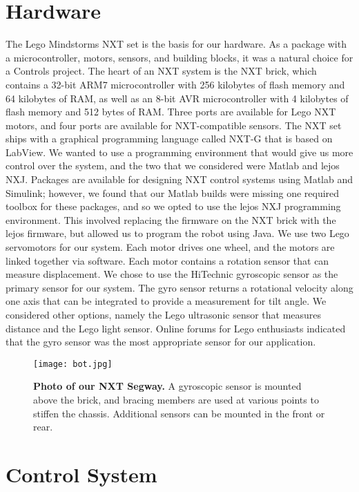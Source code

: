 \documentclass[onecolumn, draftclass]{IEEEtran} %
\begin{document}
\section{Hardware}
The Lego Mindstorms NXT set is the basis for our hardware.  As a package with a microcontroller, motors, sensors, and building blocks, it was a natural choice for a Controls project.  The heart of an NXT system is the NXT brick, which contains a 32-bit ARM7 microcontroller with 256 kilobytes of flash memory and 64 kilobytes of RAM, as well as an 8-bit AVR microcontroller with 4 kilobytes of flash memory and 512 bytes of RAM.  Three ports are available for Lego NXT motors, and four ports are available for NXT-compatible sensors.  The NXT set ships with a graphical programming language called NXT-G that is based on LabView.  We wanted to use a programming environment that would give us more control over the system, and the two that we considered were Matlab and lejos NXJ.  Packages are available for designing NXT control systems using Matlab and Simulink; however, we found that our Matlab builds were missing one required toolbox for these packages, and so we opted to use the lejos NXJ programming environment.  This involved replacing the firmware on the NXT brick with the lejos firmware, but allowed us to program the robot using Java.
We use two Lego servomotors for our system.  Each motor drives one wheel, and the motors are linked together via software.  Each motor contains a rotation sensor that can measure displacement.  We chose to use the HiTechnic gyroscopic sensor as the primary sensor for our system.  The gyro sensor returns a rotational velocity along one axis that can be integrated to provide a measurement for tilt angle.  We considered other options, namely the Lego ultrasonic sensor that measures distance and the Lego light sensor.  Online forums for Lego enthusiasts indicated that the gyro sensor was the most appropriate sensor for our application.

\begin{figure} [h]
\centering
\texttt{[image: bot.jpg]}
\caption{\textbf{Photo of our NXT Segway.} A gyroscopic sensor is mounted above the brick, and bracing members are used at various points to stiffen the chassis.  Additional sensors can be mounted in the front or rear.} \label{photo}
\end{figure}

\section{Control System}
\end{document}
